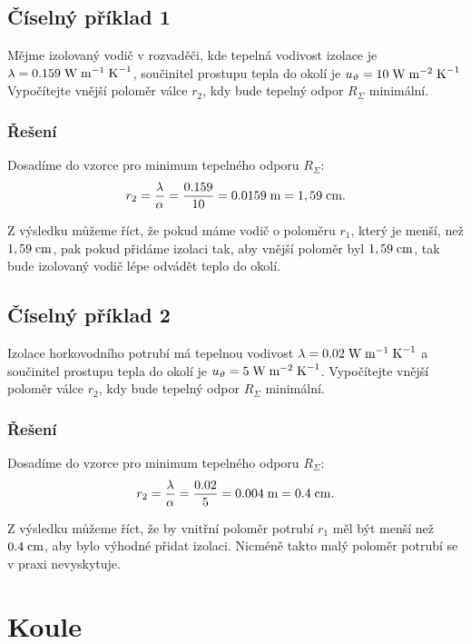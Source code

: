 \documentclass{article}
\begin{document}
\subsection{Číselný příklad 1 \spicy \spicy}
Mějme izolovaný vodič v rozvaděči, kde tepelná vodivost izolace je $\lambda = 0.159 \; \textrm{W} \; \textrm{m}^{-1} \; \textrm{K}^{-1}$, součinitel prostupu tepla do okolí je $u_{\vartheta} = 10 \; \textrm{W} \; \textrm{m}^{-2} \; \textrm{K}^{-1}$ Vypočítejte vnější poloměr válce $r_2$, kdy bude tepelný odpor $R_{\Sigma}$ minimální.

\subsubsection{Řešení}
Dosadíme do vzorce pro minimum tepelného odporu $R_{\Sigma}$:
$$
    r_2 = \frac{\lambda}{\alpha} = \frac{0.159}{10} = 0.0159 \; \textrm{m} = 1,59 \; \textrm{cm}.
$$

Z výsledku můžeme říct, že pokud máme vodič o poloměru $r_1$, který je menší, než $1,59 \; \textrm{cm}$, pak pokud přidáme izolaci tak, aby vnější poloměr byl $1,59 \; \textrm{cm}$, tak bude izolovaný vodič lépe odvádět teplo do okolí.


\subsection{Číselný příklad 2 \spicy \spicy}
Izolace horkovodního potrubí má tepelnou vodivost $\lambda = 0.02 \; \textrm{W} \; \textrm{m}^{-1} \; \textrm{K}^{-1}$ a součinitel prostupu tepla do okolí je $u_{\vartheta} = 5 \; \textrm{W} \; \textrm{m}^{-2} \; \textrm{K}^{-1}$. Vypočítejte vnější poloměr válce $r_2$, kdy bude tepelný odpor $R_{\Sigma}$ minimální.

\subsubsection{Řešení}
Dosadíme do vzorce pro minimum tepelného odporu $R_{\Sigma}$:
$$
    r_2 = \frac{\lambda}{\alpha} = \frac{0.02}{5} = 0.004 \; \textrm{m} = 0.4 \; \textrm{cm}.
$$

Z výsledku můžeme říct, že by vnitřní poloměr potrubí $r_1$ měl být menší než $0.4 \; \textrm{cm}$, aby bylo výhodné přidat izolaci. Nicméně takto malý poloměr potrubí se v praxi nevyskytuje.

\newpage



\section{Koule \spicy \spicy \spicy}
\end{document}
